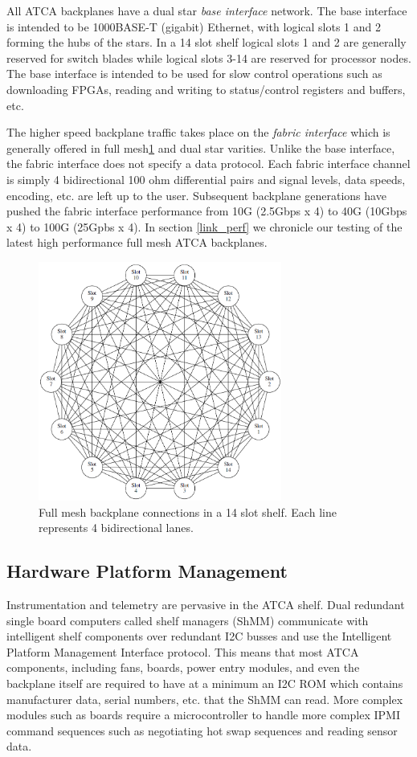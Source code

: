 \documentclass[letterpaper]{article}
\begin{document}
All ATCA backplanes have a dual star \emph{base interface} network.  The base interface is intended to be 1000BASE-T (gigabit) Ethernet, with logical slots 1 and 2 forming the hubs of the stars.  In a 14 slot shelf logical slots 1 and 2 are generally reserved for switch blades while logical slots 3-14 are reserved for processor nodes.  The base interface is intended to be used for slow control operations such as downloading FPGAs, reading and writing to status/control registers and buffers, etc.

The higher speed backplane traffic takes place on the \emph{fabric interface} which is generally offered in full mesh\ref{fullmesh} and dual star varities.  Unlike the base interface, the fabric interface does not specify a data protocol.  Each fabric interface channel is simply 4 bidirectional 100 ohm differential pairs and signal levels, data speeds, encoding, etc. are left up to the user.  Subsequent backplane generations have pushed the fabric interface performance from 10G (2.5Gbps x 4) to 40G (10Gbps x 4) to 100G (25Gpbs x 4).  In section \ref{link_perf} we chronicle our testing of the latest high performance full mesh ATCA backplanes.

\begin{figure}
\centering
\includegraphics[width=8cm]{fullmesh.png}
\caption{Full mesh backplane connections in a 14 slot shelf.  Each line represents 4 bidirectional lanes.}
\label{fullmesh}
\end{figure}

\subsection{Hardware Platform Management}

Instrumentation and telemetry are pervasive in the ATCA shelf.  Dual redundant single board computers called shelf managers (ShMM) communicate with intelligent shelf components over redundant I2C busses and use the Intelligent Platform Management Interface protocol.  This means that most ATCA components, including fans, boards, power entry modules, and even the backplane itself are required to have at a minimum an I2C ROM which contains manufacturer data, serial numbers, etc. that the ShMM can read.  More complex modules such as boards require a microcontroller to handle more complex IPMI command sequences such as negotiating hot swap sequences and reading sensor data.
\end{document}
